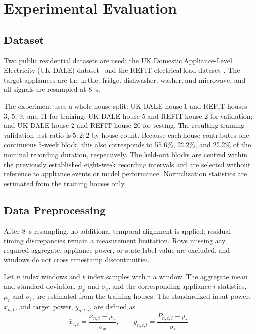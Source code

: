 \documentclass[journal]{IEEEtran}
\begin{document}
\section{Experimental Evaluation}
\label{sec:setup}

\subsection{Dataset}
Two public residential datasets are used: the UK Domestic Appliance-Level Electricity (UK-DALE) dataset~\cite{kelly2015ukdale} and the REFIT electrical-load dataset~\cite{murray2017refit}. The target appliances are the kettle, fridge, dishwasher, washer, and microwave, and all signals are resampled at 8~s.

The experiment uses a whole-house split: UK-DALE house 1 and REFIT houses 3, 5, 9, and 11 for training; UK-DALE house 5 and REFIT house 2 for validation; and UK-DALE house 2 and REFIT house 20 for testing. The resulting training-validation-test ratio is $5{:}2{:}2$ by house count. Because each house contributes one continuous 5-week block, this also corresponds to 55.6\%, 22.2\%, and 22.2\% of the nominal recording duration, respectively. The held-out blocks are centred within the previously established eight-week recording intervals and are selected without reference to appliance events or model performance. Normalization statistics are estimated from the training houses only.

\subsection{Data Preprocessing}
\label{sec:preprocess}

After 8~s resampling, no additional temporal alignment is applied; residual timing discrepancies remain a measurement limitation. Rows missing any required aggregate, appliance-power, or state-label value are excluded, and windows do not cross timestamp discontinuities.

Let $n$ index windows and $t$ index samples within a window. The aggregate mean and standard deviation, $\mu_x$ and $\sigma_x$, and the corresponding appliance-$i$ statistics, $\mu_i$ and $\sigma_i$, are estimated from the training houses. The standardized input power, $\bar{x}_{n,t}$, and target power, $y_{n,t,i}$, are defined as
\begin{equation}
\bar x_{n,t}=\frac{x_{n,t}-\mu_x}{\sigma_x},
\qquad
y_{n,t,i}=\frac{P_{n,t,i}-\mu_i}{\sigma_i}
\label{eq:power-normalization}
\end{equation}
\end{document}
